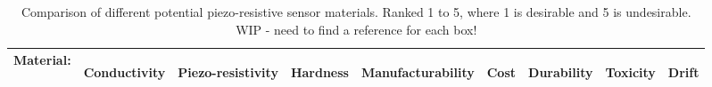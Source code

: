 \begin{table}[H]
		\centering
		\caption{Comparison of different potential piezo-resistive sensor materials. Ranked 1 to 5, where 1 is desirable and 5 is undesirable. WIP - need to find a reference for each box!}
		\label{tab:comparing-piezo-r-materials}
		\vspace{3cm}
		\begin{tabular}{|p{2cm}|p{1cm}|p{1cm}|p{1cm}|p{1cm}|p{1cm}|p{1cm}|p{1cm}|p{1cm}|}
			\multicolumn{1}{l}{\textbf{Material:}} & \multicolumn{1}{c}{\begin{rotate}{60} \hspace{0.1cm}\vspace{-2cm} \textbf{Conductivity} \end{rotate}} & 
			\multicolumn{1}{c}{\begin{rotate}{60} \hspace{0.2cm}\vspace{-2cm} \textbf{Piezo-resistivity} \end{rotate}} & 
			\multicolumn{1}{c}{\begin{rotate}{60} \hspace{0.2cm}\vspace{-2cm} \textbf{Hardness} \end{rotate}} & 
			\multicolumn{1}{c}{\begin{rotate}{60} \hspace{0.2cm}\vspace{-2cm} \textbf{Manufacturability} \end{rotate}} & 
			\multicolumn{1}{c}{\begin{rotate}{60} \hspace{0.2cm}\vspace{-2cm} \textbf{Cost} \end{rotate}} & 
			\multicolumn{1}{c}{\begin{rotate}{60} \hspace{0.2cm}\vspace{-2cm} \textbf{Durability} \end{rotate}} & 
			\multicolumn{1}{c}{\begin{rotate}{60} \hspace{0.2cm}\vspace{-2cm} \textbf{Toxicity} \end{rotate}} & 
			\multicolumn{1}{c}{\begin{rotate}{60} \hspace{0.2cm}\vspace{-2cm} \textbf{Drift} \end{rotate}} \\ \hline
			

\end{tabular}
\end{table}
